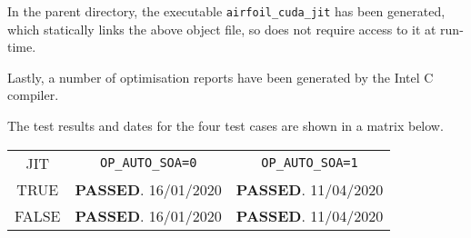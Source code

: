 \par  In the parent directory, the executable \verb|airfoil_cuda_jit| has been generated, which statically links the above object file, so does not require access to it at run-time. \par Lastly, a number of optimisation reports have been generated by the Intel C compiler.\par
\vspace{4cm}
\noindent The test results and dates for the four test cases are shown in a matrix below.
\begin{table}[h]
\centering
\renewcommand{\arraystretch}{1.5}
\begin{tabular}{| c || c | c |}
\hline
JIT & \verb|OP_AUTO_SOA=0| & \verb|OP_AUTO_SOA=1| \\
\hhline{|=|=|=|}
TRUE &\textbf{\textcolor{green!20!black}{PASSED}}. 16/01/2020 &\textbf{\textcolor{green!20!black}{PASSED}}. 11/04/2020 \\
\hline
FALSE&\textbf{\textcolor{green!20!black}{PASSED}}. 16/01/2020 &\textbf{\textcolor{green!20!black}{PASSED}}. 11/04/2020 \\
\hline
\end{tabular}
\end{table}

